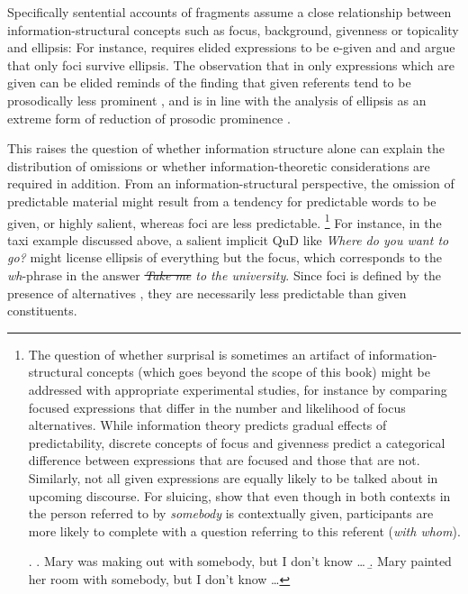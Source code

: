 Specifically sentential accounts of fragments assume a close relationship between information-structural concepts such as focus, background, givenness or topicality and ellipsis: For instance, \citet{merchant2004} requires elided expressions to be e-given and \citet{reich2007} and \citet{weir2014} argue that only foci survive ellipsis. The observation that in only expressions which are given can be elided reminds of the finding that given referents tend to be prosodically less prominent \citep{fery.ishihara2009}, and is in line with the analysis of ellipsis as an extreme form of reduction of prosodic prominence \citep{tancredi1992}.

This raises the question of whether information structure alone can explain the distribution of omissions or whether information-theoretic considerations are required in addition. From an information-structural perspective, the omission of predictable material might result from a tendency for predictable words to be given, or highly salient, whereas foci are less predictable.%
%
{\footnote{The question of whether surprisal is sometimes an artifact of infor\-mation-structural concepts (which goes beyond the scope of this book) might be addressed with appropriate experimental studies, for instance by comparing focused expressions that differ in the number and likelihood of focus alternatives. While information theory predicts gradual effects of predictability, discrete concepts of focus and givenness predict a categorical difference between expressions that are focused and those that are not. Similarly, not all given expressions are equally likely to be talked about in upcoming discourse. For sluicing, \citet{lemke.etalaccepted} show that even though in both contexts in \Next the person referred to by \textit{somebody} is contextually given, participants are more likely to complete \Next[a] with a question referring to this referent (\textit{with whom}).

\ex. \a. Mary was making out with somebody, but I don't know \dots
     \b. Mary painted her room with somebody, but I don't know \dots 
     
}\afterfn}%
%
For instance, in the taxi example discussed above, a salient implicit QuD like \textit{Where do you want to go?} might license ellipsis of everything but the focus, which corresponds to the \textit{wh}-phrase in the answer \textit{\sout{Take me} to the university}. Since foci is defined by the presence of alternatives \citep{rooth1992}, they are necessarily less predictable than given constituents. 

